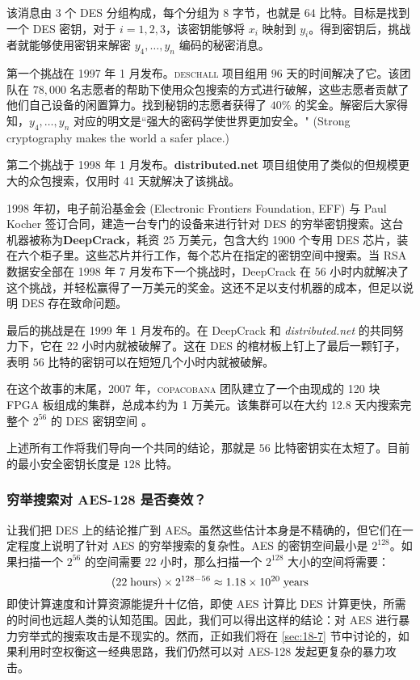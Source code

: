 \noindent
该消息由 $3$ 个 DES 分组构成，每个分组为 $8$ 字节，也就是 $64$ 比特。目标是找到一个 DES 密钥，对于 $i=1,2,3$，该密钥能够将 $x_i$ 映射到 $y_i$。得到密钥后，挑战者就能够使用密钥来解密 $y_4,\dots,y_n$ 编码的秘密消息。

第一个挑战在 1997 年 1 月发布。\textsc{deschall} 项目组用 $96$ 天的时间解决了它。该团队在 $78,000$ 名志愿者的帮助下使用众包搜索的方式进行破解，这些志愿者贡献了他们自己设备的闲置算力。找到秘钥的志愿者获得了 $40\%$ 的奖金。解密后大家得知，$y_4,\dots,y_n$ 对应的明文是``强大的密码学使世界更加安全。" (Strong cryptography makes the world a safer place.)

第二个挑战于 1998 年 1 月发布。\textbf{distributed.net} 项目组使用了类似的但规模更大的众包搜索，仅用时 41 天就解决了该挑战。

1998 年初，电子前沿基金会 (Electronic Frontiers Foundation, EFF) 与 Paul Kocher 签订合同，建造一台专门的设备来进行针对 DES 的穷举密钥搜索。这台机器被称为\textbf{DeepCrack}，耗资 25 万美元，包含大约 1900 个专用 DES 芯片，装在六个柜子里。这些芯片并行工作，每个芯片在指定的密钥空间中搜索。当 RSA 数据安全部在 1998 年 7 月发布下一个挑战时，DeepCrack 在 56 小时内就解决了这个挑战，并轻松赢得了一万美元的奖金。这还不足以支付机器的成本，但足以说明 DES 存在致命问题。

最后的挑战是在 1999 年 1 月发布的。在 DeepCrack 和 \emph{distributed.net} 的共同努力下，它在 22 小时内就被破解了。这在 DES 的棺材板上钉上了最后一颗钉子，表明 $56$ 比特的密钥可以在短短几个小时内就被破解。

在这个故事的末尾，2007 年，\textsc{copacobana} 团队建立了一个由现成的 120 块 FPGA 板组成的集群，总成本约为 1 万美元。该集群可以在大约 12.8 天内搜索完整个 $2^{56}$ 的 DES 密钥空间 \cite{guneysu2008cryptanalysis}。

上述所有工作将我们导向一个共同的结论，那就是 $56$ 比特密钥实在太短了。目前的最小安全密钥长度是 $128$ 比特。

\subsubsection{穷举搜索对 AES-128 是否奏效？}\label{subsubsec:4-2-2-1}

让我们把 DES 上的结论推广到 AES。虽然这些估计本身是不精确的，但它们在一定程度上说明了针对 AES 的穷举搜索的复杂性。AES 的密钥空间最小是 $2^{128}$。如果扫描一个 $2^{56}$ 的空间需要 22 小时，那么扫描一个 $2^{128}$ 大小的空间将需要：
\[
(22\;{\rm hours})\times2^{128-56}\approx1.18\times10^{20}\;{\rm years}
\]
即使计算速度和计算资源能提升十亿倍，即使 AES 计算比 DES 计算更快，所需的时间也远超人类的认知范围。因此，我们可以得出这样的结论：对 AES 进行暴力穷举式的搜索攻击是不现实的。然而，正如我们将在 \ref{sec:18-7} 节中讨论的，如果利用时空权衡这一经典思路，我们仍然可以对 AES-128 发起更复杂的暴力攻击。


